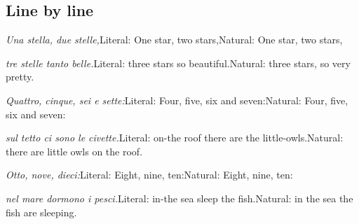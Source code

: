 \documentclass[11pt,a4paper,twoside,openright]{book}
\begin{document}
\subsection*{Line by line}
\begin{sentences}
\item\relax \textit{Una stella, due stelle,}\newline Literal: One star, two stars,\newline Natural: One star, two stars,
\item\relax \textit{tre stelle tanto belle.}\newline Literal: three stars so beautiful.\newline Natural: three stars, so very pretty.
\item\relax \textit{Quattro, cinque, sei e sette:}\newline Literal: Four, five, six and seven:\newline Natural: Four, five, six and seven:
\item\relax \textit{sul tetto ci sono le civette.}\newline Literal: on-the roof there are the little-owls.\newline Natural: there are little owls on the roof.
\item\relax \textit{Otto, nove, dieci:}\newline Literal: Eight, nine, ten:\newline Natural: Eight, nine, ten:
\item\relax \textit{nel mare dormono i pesci.}\newline Literal: in-the sea sleep the fish.\newline Natural: in the sea the fish are sleeping.

\end{sentences}
\end{document}
